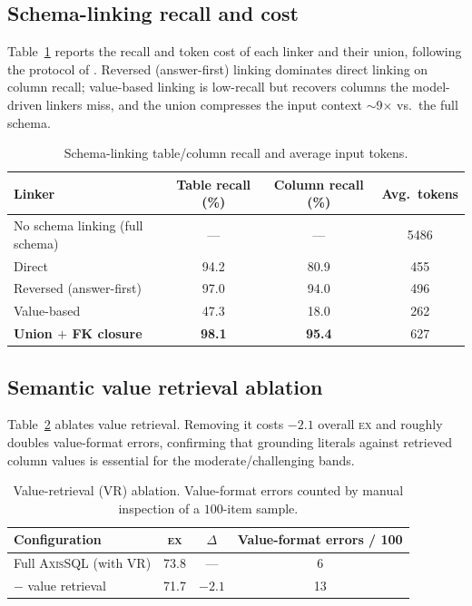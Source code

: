 \documentclass{article}
\newcommand{\sys}{\textsc{AxisSQL}\xspace}
\newcommand{\ex}{\textsc{ex}\xspace}
\begin{document}
\subsection{Schema-linking recall and cost}
\label{app:linking}
Table~\ref{tab:s-linking} reports the recall and token cost of each linker and their union, following the protocol of \citet{li2026deepeye}. Reversed (answer-first) linking dominates direct linking on column recall; value-based linking is low-recall but recovers columns the model-driven linkers miss, and the union compresses the input context $\sim$9$\times$ vs.\ the full schema.

\begin{table}[h]
\centering\small
\caption{Schema-linking table/column recall and average input tokens.}
\label{tab:s-linking}
\begin{tabular}{@{}lccc@{}}
\toprule
\textbf{Linker} & \textbf{Table recall (\%)} & \textbf{Column recall (\%)} & \textbf{Avg.\ tokens} \\
\midrule
No schema linking (full schema) & --- & --- & 5486 \\
Direct                          & 94.2 & 80.9 & 455 \\
Reversed (answer-first)         & 97.0 & 94.0 & 496 \\
Value-based                     & 47.3 & 18.0 & 262 \\
\textbf{Union $+$ FK closure}   & \textbf{98.1} & \textbf{95.4} & 627 \\
\bottomrule
\end{tabular}
\end{table}

\subsection{Semantic value retrieval ablation}
\label{app:value}
Table~\ref{tab:s-value} ablates value retrieval. Removing it costs $-2.1$ overall \ex{} and roughly doubles value-format errors, confirming that grounding literals against retrieved column values is essential for the moderate/challenging bands.

\begin{table}[h]
\centering\small
\caption{Value-retrieval (VR) ablation. Value-format errors counted by manual inspection of a $100$-item sample.}
\label{tab:s-value}
\begin{tabular}{@{}lccc@{}}
\toprule
\textbf{Configuration} & \textbf{\ex} & \textbf{$\Delta$} & \textbf{Value-format errors / 100} \\
\midrule
Full \sys{} (with VR) & 73.8 & ---    & 6 \\
$-$ value retrieval   & 71.7 & $-2.1$ & 13 \\
\bottomrule
\end{tabular}
\end{table}
\end{document}
